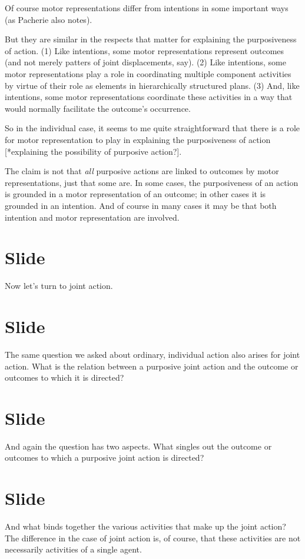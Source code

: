 \documentclass[12pt,\papersize]{extarticle}
\begin{document}
Of course motor representations differ from intentions in some important ways (as Pacherie also notes).

But they are similar in the respects that matter for explaining the purposiveness of action.
(1) Like intentions, some motor representations represent outcomes (and not merely patters of joint displacements, say).
(2) Like intentions, some motor representations play a role in coordinating multiple  component activities by virtue of their role as elements in hierarchically structured plans.
(3) And, like intentions, some motor representations coordinate these activities in a way that would normally facilitate the outcome’s occurrence.

So in the individual case, it seems to me quite straightforward that there is a role for motor representation to play in explaining the purposiveness of action [*explaining the possibility of purposive action?].

The claim is not that \emph{all} purposive actions are linked to outcomes by motor representations, just that some are.
In some cases, the purposiveness of an action is grounded in a motor representation of an outcome; in other cases it is grounded in an intention.
And of course in many cases it may be that both intention and motor representation are involved.



\section{Slide}
Now let’s turn to joint action.



\section{Slide}
The same question we asked about ordinary, individual action also arises for joint action.
What is the relation between a purposive joint action and the outcome or outcomes to which it is directed?




\section{Slide}
And again the question has two aspects.
What singles out the outcome or outcomes to which a purposive joint action is directed?



\section{Slide}
And what binds together the various activities that make up the joint action?
The difference in the case of joint action is, of course, that these activities are not necessarily activities of a single agent.
\end{document}
